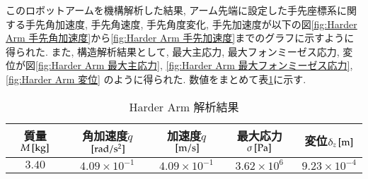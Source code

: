\documentclass[10pt,b5paper,papersize,dvipdfmx]{jsbook}
\begin{document}
このロボットアームを機構解析した結果, アーム先端に設定した手先座標系に関する手先角加速度, 手先角速度, 手先角度変化, 手先加速度が以下の図\ref{fig:Harder Arm 手先角加速度}から\ref{fig:Harder Arm 手先加速度}までのグラフに示すように得られた. また, 構造解析結果として, 最大主応力, 最大フォンミーゼス応力, 変位が図\ref{fig:Harder Arm 最大主応力}, \ref{fig:Harder Arm 最大フォンミーゼス応力}, \ref{fig:Harder Arm 変位} のように得られた. 数値をまとめて表\ref{tbl:Harder Arm 解析結果}に示す.
\begin{table}[htbp]
  \centering
  \caption{Harder Arm 解析結果}
  \label{tbl:Harder Arm 解析結果}
  \begin{tabular}{|c|c|c|c|c|} \hline
    質量$M\tani*{kg}$& 角加速度$\ddot{q}$$\tani*{rad/s^2}$& 加速度$\dot{q}$$\tani*{m/s}$& 最大応力$\sigma\tani*{Pa}$& 変位$\delta_z\tani*{m}$\\ \hline
    $3.40$&$4.09\times 10^{-1}$&$4.09\times 10^{-1}$&$3.62\times 10^6$&$9.23\times 10^{-4}$\\ \hline
  \end{tabular}
\end{table}
\end{document}
